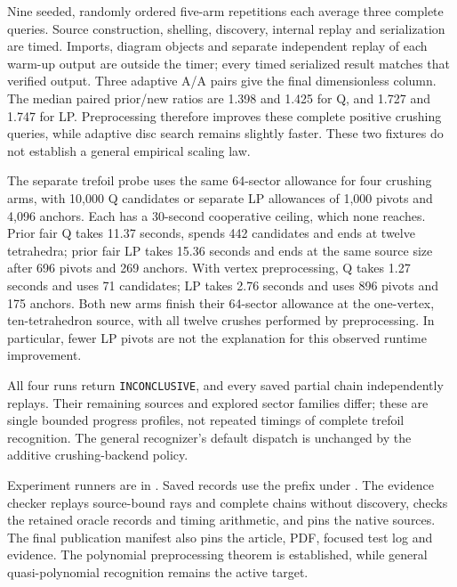 Nine seeded, randomly ordered five-arm repetitions each average three
complete queries.  Source construction, shelling, discovery, internal
replay and serialization are timed.  Imports, diagram objects and separate
independent replay of each warm-up output are outside the timer; every
timed serialized result matches that verified output.  Three adaptive A/A
pairs give the final dimensionless column.  The median paired prior/new
ratios are 1.398 and 1.425 for Q, and 1.727 and 1.747 for LP.  Preprocessing
therefore improves these complete positive crushing queries, while adaptive
disc search remains slightly faster.  These two fixtures do not establish
a general empirical scaling law.

The separate trefoil probe uses the same 64-sector allowance for four
crushing arms, with 10,000 Q candidates or separate LP allowances of
1,000 pivots and 4,096 anchors.  Each has a 30-second cooperative ceiling,
which none reaches.  Prior fair Q takes 11.37 seconds, spends 442 candidates
and ends at twelve tetrahedra; prior fair LP takes 15.36 seconds and ends
at the same source size after 696 pivots and 269 anchors.  With vertex
preprocessing, Q takes 1.27 seconds and uses 71 candidates; LP takes 2.76
seconds and uses 896 pivots and 175 anchors.  Both new arms finish their
64-sector allowance at the one-vertex, ten-tetrahedron source, with all
twelve crushes performed by preprocessing.  In particular, fewer LP pivots
are not the explanation for this observed runtime improvement.

All four runs return \texttt{INCONCLUSIVE}, and every saved partial chain
independently replays.  Their remaining sources and explored sector families
differ; these are single bounded progress profiles, not repeated timings
of complete trefoil recognition.  The general recognizer's default dispatch
is unchanged by the additive crushing-backend policy.

Experiment runners are in .
Saved records use the prefix  under
.  The evidence checker
replays source-bound rays and complete chains without discovery, checks
the retained oracle records and timing arithmetic, and pins the native
sources.  The final publication manifest also pins the article, PDF,
focused test log and evidence.  The polynomial preprocessing theorem is
established, while general quasi-polynomial recognition remains the active
target.

